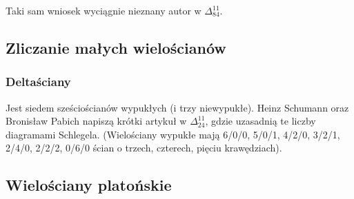Taki sam wniosek wyciągnie nieznany autor w $\Delta_{84}^{11}$.


\subsection{Zliczanie małych wielościanów}
\subsubsection{Deltaściany}


Jest siedem sześciościanów wypukłych (i trzy niewypukłe).
Heinz Schumann oraz Bronisław Pabich napiszą krótki artykuł w $\Delta_{24}^{11}$, gdzie uzasadnią te liczby diagramami Schlegela.
%
(Wielościany wypukłe mają 6/0/0, 5/0/1, 4/2/0, 3/2/1, 2/4/0, 2/2/2, 0/6/0 ścian o trzech, czterech, pięciu krawędziach).

\subsection{Wielościany platońskie}

